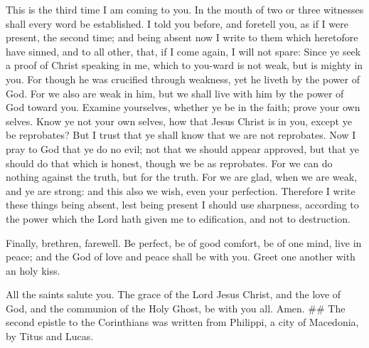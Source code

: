  This is the third time I am coming to you. In the mouth
of two or three witnesses shall every word be established.
 I told you before, and foretell you, as if I were
present, the second time; and being absent now I write to them which
heretofore have sinned, and to all other, that, if I come again, I will
not spare:  Since ye seek a proof of Christ speaking in
me, which to you-ward is not weak, but is mighty in you. 
For though he was crucified through weakness, yet he liveth by the power
of God. For we also are weak in him, but we shall live with him by the
power of God toward you.  Examine yourselves, whether ye
be in the faith; prove your own selves. Know ye not your own selves, how
that Jesus Christ is in you, except ye be reprobates?  But
I trust that ye shall know that we are not reprobates. 
Now I pray to God that ye do no evil; not that we should appear
approved, but that ye should do that which is honest, though we be as
reprobates.  For we can do nothing against the truth, but
for the truth.  For we are glad, when we are weak, and ye
are strong: and this also we wish, even your perfection. 
Therefore I write these things being absent, lest being present I should
use sharpness, according to the power which the Lord hath given me to
edification, and not to destruction.

 Finally, brethren, farewell. Be perfect, be of good
comfort, be of one mind, live in peace; and the God of love and peace
shall be with you.  Greet one another with an holy kiss.

 All the saints salute you.  The grace of
the Lord Jesus Christ, and the love of God, and the communion of the
Holy Ghost, be with you all. Amen. \#\# The second epistle to the
Corinthians was written from Philippi, a city of Macedonia, by Titus and
Lucas.
